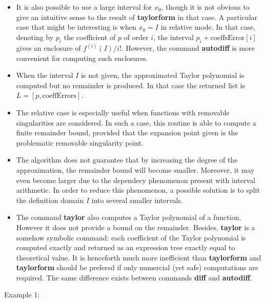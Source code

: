 \begin{itemize}
\item It is also possible to use a large interval for $x_0$, though it is not
   obvious to give an intuitive sense to the result of \textbf{taylorform} in that case.
   A particular case that might be interesting is when $x_0 = I$ in relative mode.
   In that case, denoting by $p_i$ the coefficient of $p$ of order $i$, the interval
   $p_i + \textrm{coeffsError}[i]$ gives an enclosure of $f^{(i)}(I)/i!$.
   However, the command \textbf{autodiff} is more convenient for computing such
   enclosures.

\item When the interval $I$ is not given, the approximated Taylor polynomial is
   computed but no remainder is produced. In that case the returned list
   is $L = \left[p, \textrm{coeffErrors}\right]$.

\item The relative case is especially useful when functions with removable
   singularities are considered. In such a case, this routine is able to compute
   a finite remainder bound, provided that the expansion point given is the
   problematic removable singularity point.

\item The algorithm does not guarantee that by increasing the degree of the
   approximation, the remainder bound will become smaller. Moreover, it may 
   even become larger due to the dependecy phenomenon present with interval
   arithmetic. In order to reduce this phenomenon, a possible solution is to
   split the definition domain $I$ into several smaller intervals. 

\item The command \textbf{taylor} also computes a Taylor polynomial of a function. However
   it does not provide a bound on the remainder. Besides, \textbf{taylor} is a somehow
   symbolic command: each coefficient of the Taylor polynomial is computed
   exactly and returned as an expression tree exactly equal to theoretical
   value. It is henceforth much more inefficient than \textbf{taylorform} and \textbf{taylorform}
   should be prefered if only numercial (yet safe) computations are required.
   The same difference exists between commands \textbf{diff} and \textbf{autodiff}.
\end{itemize}
\noindent Example 1: 
